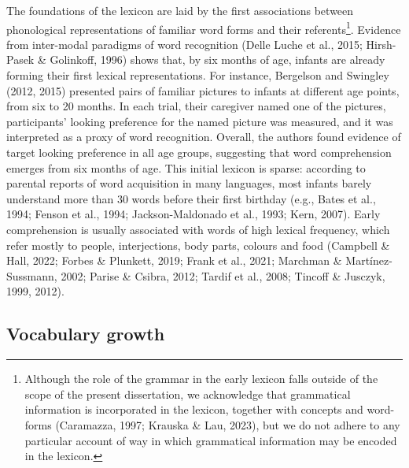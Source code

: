 \documentclass[
  12pt,
  b5paperpaper,
  twoside]{scrreprt}
\begin{document}
The foundations of the lexicon are laid by the first associations
between phonological representations of familiar word forms and their
referents\footnote{Although the role of the grammar in the early lexicon
  falls outside of the scope of the present dissertation, we acknowledge
  that grammatical information is incorporated in the lexicon, together
  with concepts and word-forms (Caramazza, 1997; Krauska \& Lau, 2023),
  but we do not adhere to any particular account of way in which
  grammatical information may be encoded in the lexicon.}. Evidence from
inter-modal paradigms of word recognition (Delle Luche et al., 2015;
Hirsh-Pasek \& Golinkoff, 1996) shows that, by six months of age,
infants are already forming their first lexical representations. For
instance, Bergelson and Swingley (2012, 2015) presented pairs of
familiar pictures to infants at different age points, from six to 20
months. In each trial, their caregiver named one of the pictures,
participants' looking preference for the named picture was measured, and
it was interpreted as a proxy of word recognition. Overall, the authors
found evidence of target looking preference in all age groups,
suggesting that word comprehension emerges from six months of age. This
initial lexicon is sparse: according to parental reports of word
acquisition in many languages, most infants barely understand more than
30 words before their first birthday (e.g., Bates et al., 1994; Fenson
et al., 1994; Jackson-Maldonado et al., 1993; Kern, 2007). Early
comprehension is usually associated with words of high lexical
frequency, which refer mostly to people, interjections, body parts,
colours and food (Campbell \& Hall, 2022; Forbes \& Plunkett, 2019;
Frank et al., 2021; Marchman \& Martínez-Sussmann, 2002; Parise \&
Csibra, 2012; Tardif et al., 2008; Tincoff \& Jusczyk, 1999, 2012).

\hypertarget{vocabulary-growth}{%
\subsection{Vocabulary growth}\label{vocabulary-growth}}
\end{document}
